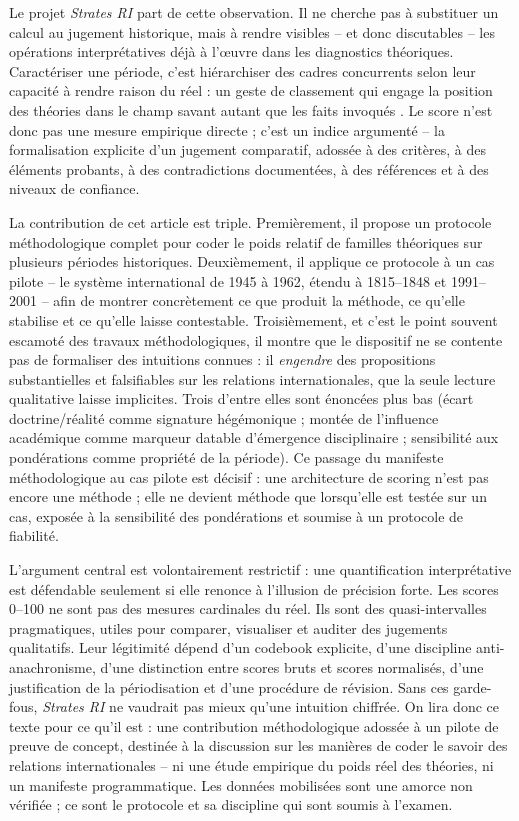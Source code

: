 \documentclass[11pt,a4paper]{article}
\begin{document}
Le projet \emph{Strates RI} part de cette observation. Il ne cherche pas à substituer un calcul au jugement historique, mais à rendre visibles -- et donc discutables -- les opérations interprétatives déjà à l'œuvre dans les diagnostics théoriques. Caractériser une période, c'est hiérarchiser des cadres concurrents selon leur capacité à rendre raison du réel : un geste de classement qui engage la position des théories dans le champ savant autant que les faits invoqués \citep{bourdieu1976champ}. Le score n'est donc pas une mesure empirique directe ; c'est un indice argumenté -- la formalisation explicite d'un jugement comparatif, adossée à des critères, à des éléments probants, à des contradictions documentées, à des références et à des niveaux de confiance.

La contribution de cet article est triple. Premièrement, il propose un protocole méthodologique complet pour coder le poids relatif de familles théoriques sur plusieurs périodes historiques. Deuxièmement, il applique ce protocole à un cas pilote -- le système international de 1945 à 1962, étendu à 1815--1848 et 1991--2001 -- afin de montrer concrètement ce que produit la méthode, ce qu'elle stabilise et ce qu'elle laisse contestable. Troisièmement, et c'est le point souvent escamoté des travaux méthodologiques, il montre que le dispositif ne se contente pas de formaliser des intuitions connues : il \emph{engendre} des propositions substantielles et falsifiables sur les relations internationales, que la seule lecture qualitative laisse implicites. Trois d'entre elles sont énoncées plus bas (écart doctrine/réalité comme signature hégémonique ; montée de l'influence académique comme marqueur datable d'émergence disciplinaire ; sensibilité aux pondérations comme propriété de la période). Ce passage du manifeste méthodologique au cas pilote est décisif : une architecture de scoring n'est pas encore une méthode ; elle ne devient méthode que lorsqu'elle est testée sur un cas, exposée à la sensibilité des pondérations et soumise à un protocole de fiabilité.

L'argument central est volontairement restrictif : une quantification interprétative est défendable seulement si elle renonce à l'illusion de précision forte. Les scores 0--100 ne sont pas des mesures cardinales du réel. Ils sont des quasi-intervalles pragmatiques, utiles pour comparer, visualiser et auditer des jugements qualitatifs. Leur légitimité dépend d'un codebook explicite, d'une discipline anti-anachronisme, d'une distinction entre scores bruts et scores normalisés, d'une justification de la périodisation et d'une procédure de révision. Sans ces garde-fous, \emph{Strates RI} ne vaudrait pas mieux qu'une intuition chiffrée. On lira donc ce texte pour ce qu'il est : une contribution méthodologique adossée à un pilote de preuve de concept, destinée à la discussion sur les manières de coder le savoir des relations internationales -- ni une étude empirique du poids réel des théories, ni un manifeste programmatique. Les données mobilisées sont une amorce non vérifiée ; ce sont le protocole et sa discipline qui sont soumis à l'examen.
\end{document}
